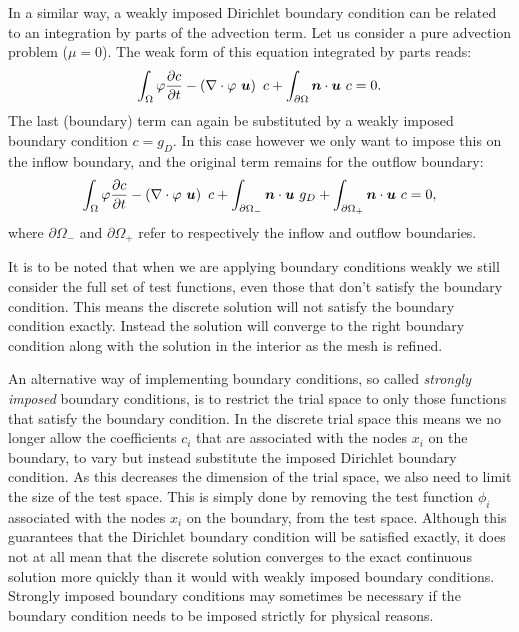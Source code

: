 In a similar way, a weakly imposed Dirichlet boundary condition can be related to an 
integration by parts of the advection term. Let us consider a pure advection problem 
($\mu=0$). The weak form of this equation integrated by parts reads:
\begin{equation*}
  \int_\Omega \varphi \frac{\partial c}{\partial t} -
    \left(\nabla\cdot \varphi~{\mbox{\boldmath$u$}}\right)~c +
    \int_{\partial\Omega} {\mbox{\boldmath$n$}}\cdot{\mbox{\boldmath$u$}}~c
    = 0.
\end{equation*}
The last (boundary) term can again be substituted by a weakly imposed
boundary condition $c=g_D$.  In this case however we only want to impose
this on the inflow boundary, and the original term remains for the outflow
boundary:
\begin{equation}\label{eq:adv_integrated_by_parts}  
  \int_\Omega \varphi \frac{\partial c}{\partial t} -
    \left(\nabla\cdot \varphi~{\mbox{\boldmath$u$}}\right)~c +
    \int_{\partial\Omega_-} {\mbox{\boldmath$n$}}\cdot{\mbox{\boldmath$u$}}~g_D +
    \int_{\partial\Omega_+} {\mbox{\boldmath$n$}}\cdot{\mbox{\boldmath$u$}}~c
    = 0,
\end{equation}
where $\partial\Omega_-$ and $\partial\Omega_+$ refer to respectively 
the inflow and outflow boundaries.

It is to be noted that when we are applying boundary conditions weakly we
still consider the full set of test functions, even those that don't satisfy
the boundary condition. This means the discrete solution will not satisfy
the boundary condition exactly. Instead the solution will converge to the
right boundary condition along with the solution in the interior as the mesh
is refined.

 An alternative way of
implementing boundary conditions, so called \emph{strongly imposed} boundary
conditions, is to restrict the trial space to only those functions that
satisfy the boundary condition. In the discrete trial space this means we no
longer allow the coefficients $c_i$ that are associated with the nodes $x_i$
on the boundary, to vary but instead substitute the imposed Dirichlet
boundary condition. As this decreases the dimension of the trial space, we
also need to limit the size of the test space. This is simply done by
removing the test function $\phi_i$ associated with the nodes $x_i$ on the
boundary, from the test space. Although this guarantees that the Dirichlet
boundary condition will be satisfied exactly, it does not at all mean that
the discrete solution converges to the exact continuous solution more
quickly than it would with weakly imposed boundary conditions. Strongly
imposed boundary conditions may sometimes be necessary if the boundary
condition needs to be imposed strictly for physical reasons.

